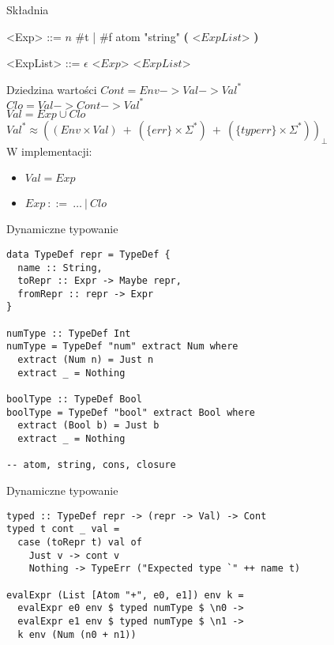 \documentclass[12pt,serif]{beamer}
\begin{document}
\begin{frame}{Składnia}
\setlength{\grammarindent}{8em}
\begin{grammar}
<Exp> ::= $n$
\alt \#t | \#f
\alt atom
\alt "string"
\alt \textbf{(} <$ExpList$> \textbf{)}

<ExpList> ::= $\epsilon$
\alt <$Exp$> <$ExpList$>
\end{grammar}
\end{frame}

\begin{frame}{Dziedzina wartości}
$Cont = Env -> Val -> Val^{*}$ \\
$Clo = Val -> Cont -> Val^{*}$ \\
$Val = Exp \cup Clo$ \\
$Val^{*} \approx ((Env \times Val)~+~(\{err\} \times \Sigma^{*})~+~(\{typerr\} \times \Sigma^{*}))_{\bot}$\newline
\\
\pause
W implementacji:
\begin{itemize}
  \item $Val = Exp$
  \item $Exp~::=~\ldots~|~Clo$
\end{itemize}
\end{frame}


\begin{frame}[fragile]{Dynamiczne typowanie}
\footnotesize \begin{verbatim}
data TypeDef repr = TypeDef {
  name :: String,
  toRepr :: Expr -> Maybe repr,
  fromRepr :: repr -> Expr
}

numType :: TypeDef Int
numType = TypeDef "num" extract Num where
  extract (Num n) = Just n
  extract _ = Nothing

boolType :: TypeDef Bool
boolType = TypeDef "bool" extract Bool where
  extract (Bool b) = Just b
  extract _ = Nothing
  
-- atom, string, cons, closure
\end{verbatim}
\end{frame}

\begin{frame}[fragile]{Dynamiczne typowanie}
\footnotesize \begin{verbatim}
typed :: TypeDef repr -> (repr -> Val) -> Cont
typed t cont _ val =
  case (toRepr t) val of
    Just v -> cont v
    Nothing -> TypeErr ("Expected type `" ++ name t)

evalExpr (List [Atom "+", e0, e1]) env k =
  evalExpr e0 env $ typed numType $ \n0 ->
  evalExpr e1 env $ typed numType $ \n1 ->
  k env (Num (n0 + n1))
\end{verbatim}
\end{frame}
\end{document}
